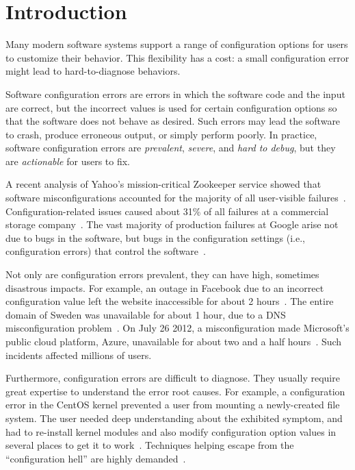 
\section{Introduction}
\label{sec:introduction}

Many modern software systems support %
a range of configuration options for users to
customize their behavior. This flexibility has a cost:
a small configuration error might lead to hard-to-diagnose
behaviors.

Software configuration errors are errors in which
the software code and the input are correct, but the incorrect
values is used for certain configuration options so that the software does not behave
as desired. Such errors may lead
the software to crash,
produce erroneous output, or simply perform poorly.
In practice, software configuration
errors are \textit{prevalent}, \textit{severe}, and
\textit{hard to debug}, but they are \textit{actionable} for users to fix.


A recent analysis of Yahoo's mission-critical Zookeeper service
showed that software misconfigurations accounted for
the majority of all user-visible failures~\cite{bft}.
Configuration-related issues caused about 31\% of all
failures at a commercial storage company~\cite{Yin:2011:ESC}.
The vast majority of production failures at Google
arise not due to bugs in the software, but bugs in the
configuration settings (i.e., configuration errors)
that control the software~\cite{googleconf}.

Not only are configuration errors prevalent, they
can have high, sometimes disastrous impacts. For example,
an outage in Facebook due to
an incorrect configuration value left the website 
inaccessible for about 2 hours~\cite{fbout}. 
The entire  domain of Sweden was unavailable
for about 1 hour, due to a DNS misconfiguration problem~\cite{sedown}.
On July 26 2012, 
a misconfiguration made 
Microsoft's public cloud platform, Azure,
unavailable for about two and a half hours~\cite{msdown}.
Such incidents affected millions of users.

Furthermore, configuration errors are difficult to diagnose. 
They usually require great expertise to understand
the error root causes. For example, a
configuration error in the CentOS kernel prevented
a user from mounting a newly-created file system.
The user needed deep understanding about the
exhibited symptom,  and had to re-install kernel modules and
also modify configuration option values in
several places to get it to work~\cite{Yin:2011:ESC}.
Techniques helping escape from the ``configuration hell''
are highly demanded~\cite{googleconf}.

